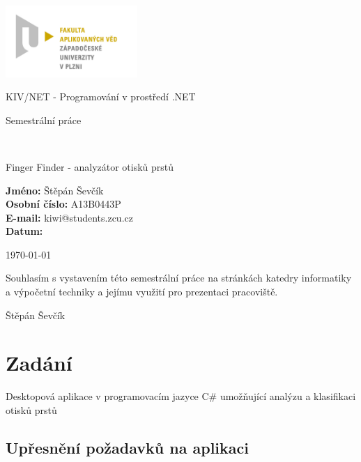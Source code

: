 \documentclass[12pt,a4paper]{article}
\author{Jan Šmejkal}
\let\oldsection\section
\renewcommand\section{\clearpage\oldsection}
\begin{document}
\begin{titlepage}

\includegraphics[width=50mm]{img/FAV.jpg}
\\[160 pt]
\centerline{ \Huge \sc KIV/NET - Programování v prostředí .NET}
\centerline{ \huge \sc Semestrální práce }
\\[12 pt]
{\large \sc
\centerline{Finger Finder - analyzátor otisků prstů}
}


{
\vfill 
\parindent=0cm
\textbf{Jméno:} Štěpán Ševčík\\
\textbf{Osobní číslo:} A13B0443P\\
\textbf{E-mail:} kiwi@students.zcu.cz\\
\textbf{Datum:} {\large \today\par} %

}

\end{titlepage}


Souhlasím s vystavením této semestrální práce na stránkách katedry informatiky a výpočetní techniky a jejímu využití pro prezentaci pracoviště.
\begin{flushright}
Štěpán Ševčík
\end{flushright}

\newpage
\setcounter{page}{2}
\setcounter{tocdepth}{3}
\tableofcontents



\section{Zadání}
Desktopová aplikace v programovacím jazyce C\# umožňující analýzu a klasifikaci otisků prstů

\subsection{Upřesnění požadavků na aplikaci}
\end{document}
